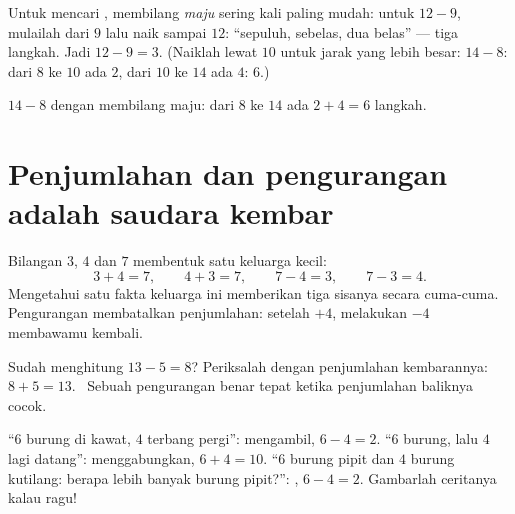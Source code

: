 \begin{method}\label{met:g1:subtraction:countup}
Untuk mencari , membilang \emph{maju} sering kali paling
mudah: untuk $12 - 9$, mulailah dari $9$ lalu naik sampai $12$:
``sepuluh, sebelas, dua belas'' --- tiga langkah. Jadi $12 - 9 = 3$.
(Naiklah lewat $10$ untuk jarak yang lebih besar: $14 - 8$: dari $8$
ke $10$ ada $2$, dari $10$ ke $14$ ada $4$:  $6$.)
\end{method}

\begin{omfigure}

{\small $14 - 8$ dengan membilang maju: dari $8$ ke $14$ ada
$2 + 4 = 6$ langkah.}
\end{omfigure}

\section{Penjumlahan dan pengurangan adalah saudara kembar}

\begin{example}\label{ex:g1:subtraction:family}
Bilangan $3$, $4$ dan $7$ membentuk satu keluarga kecil:
\[
3 + 4 = 7, \qquad
4 + 3 = 7, \qquad
7 - 4 = 3, \qquad
7 - 3 = 4 .
\]
Mengetahui satu fakta keluarga ini memberikan tiga sisanya secara
cuma-cuma. Pengurangan membatalkan penjumlahan: setelah $+4$,
melakukan $-4$ membawamu kembali.
\end{example}

\begin{example}[Memeriksa]\label{ex:g1:subtraction:check}
Sudah menghitung $13 - 5 = 8$? Periksalah dengan penjumlahan
kembarannya: $8 + 5 = 13$. \checkmark\ Sebuah pengurangan benar
tepat ketika penjumlahan baliknya cocok.
\end{example}

\begin{example}\label{ex:g1:subtraction:choose}
``$6$ burung di kawat, $4$ terbang pergi'': mengambil, $6 - 4 = 2$.
``$6$ burung, lalu $4$ lagi datang'': menggabungkan, $6 + 4 = 10$.
``$6$ burung pipit dan $4$ burung kutilang: berapa lebih banyak
burung pipit?'': , $6 - 4 = 2$. Gambarlah ceritanya kalau ragu!
\end{example}

